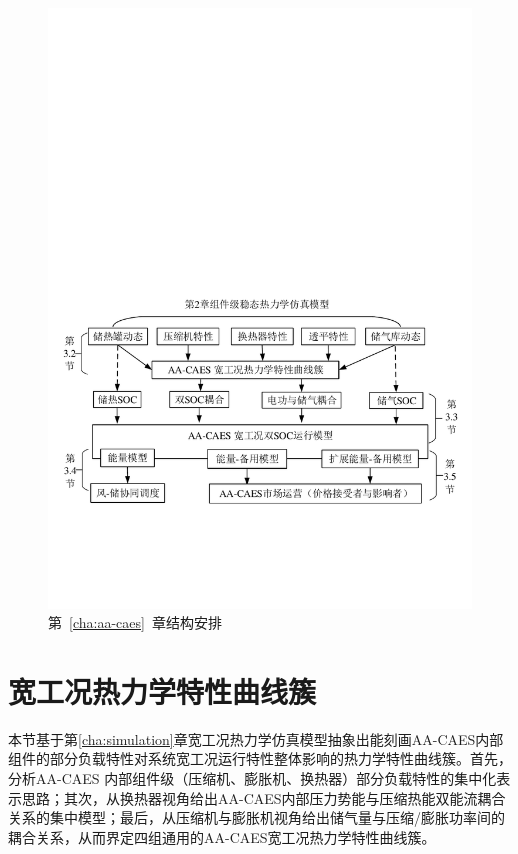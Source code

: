 \begin{figure}[H] %
  \centering
  \includegraphics[scale=0.72]{figures/Chap3-1-AA-CAES-Flow-Chart-V4.pdf}
  \caption{第~\ref{cha:aa-caes}~章结构安排}
  \label{fig:AA-CAES-Flow-Chart}
\end{figure}

\section{宽工况热力学特性曲线簇}
\label{sec:chap3-aa-caes-sim}
本节基于第\ref{cha:simulation}章宽工况热力学仿真模型抽象出能刻画AA-CAES内部组件的部分负载特性对系统宽工况运行特性整体影响的热力学特性曲线簇。首先，分析AA-CAES 内部组件级（压缩机、膨胀机、换热器）部分负载特性的集中化表示思路；其次，从换热器视角给出AA-CAES内部压力势能与压缩热能双能流耦合关系的集中模型；最后，从压缩机与膨胀机视角给出储气量与压缩/膨胀功率间的耦合关系，从而界定四组通用的AA-CAES宽工况热力学特性曲线簇。

